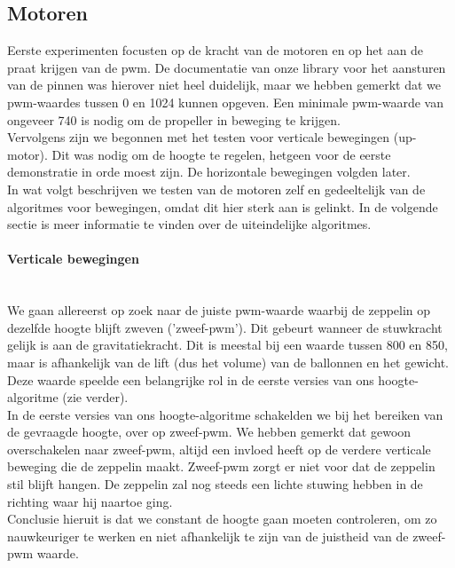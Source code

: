 \documentclass[eind]{penoverslag}
\begin{document}
\subsection{Motoren}
Eerste experimenten focusten op de kracht van de motoren en op het aan de praat krijgen van de pwm. De documentatie van onze library voor het aansturen van de pinnen was hierover niet heel duidelijk, maar we hebben gemerkt dat we pwm-waardes tussen 0 en 1024 kunnen opgeven. Een minimale pwm-waarde van ongeveer 740 is nodig om de propeller in beweging te krijgen. \\

Vervolgens zijn we begonnen met het testen voor verticale bewegingen (up-motor). Dit was nodig om de hoogte te regelen, hetgeen voor de eerste demonstratie in orde moest zijn. De horizontale bewegingen volgden later. \\

In wat volgt beschrijven we testen van de motoren zelf en gedeeltelijk van de algoritmes voor bewegingen, omdat dit hier sterk aan is gelinkt. In de volgende sectie is meer informatie te vinden over de uiteindelijke algoritmes.

\paragraph{Verticale bewegingen} ~\\
We gaan allereerst op zoek naar de juiste pwm-waarde waarbij de zeppelin op dezelfde hoogte blijft zweven ('zweef-pwm'). Dit gebeurt wanneer de stuwkracht gelijk is aan de gravitatiekracht. Dit is meestal bij een waarde tussen 800 en 850, maar is afhankelijk van de lift (dus het volume) van de ballonnen en het gewicht. Deze waarde speelde een belangrijke rol in de eerste versies van ons hoogte-algoritme (zie verder). \\

In de eerste versies van ons hoogte-algoritme schakelden we bij het bereiken van de gevraagde hoogte, over op zweef-pwm. We hebben gemerkt dat gewoon overschakelen naar zweef-pwm, altijd een invloed heeft op de verdere verticale beweging die de zeppelin maakt. Zweef-pwm zorgt er niet voor dat de zeppelin stil blijft hangen. De zeppelin zal nog steeds een lichte stuwing hebben in de richting waar hij naartoe ging. \\

Conclusie hieruit is dat we constant de hoogte gaan moeten controleren, om zo nauwkeuriger te werken en niet afhankelijk te zijn van de juistheid van de zweef-pwm waarde. \\
\end{document}
